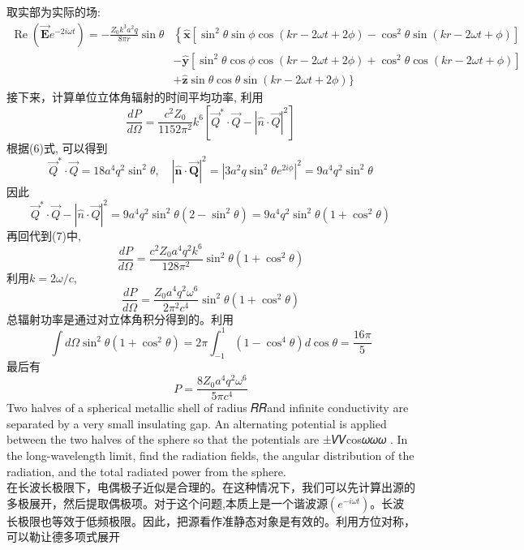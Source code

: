 \documentclass[UTF8,9pt]{ctexart}
\begin{document}
取实部为实际的场:$$ 
\begin{aligned} \operatorname{Re}\left(\overrightarrow{\boldsymbol{E}} e^{-2 i \omega t}\right)=-\frac{Z_{0} k^{3} a^{2} q}{8 \pi r} \sin \theta &\left\{\hat{\boldsymbol{x}}\left[\sin ^{2} \theta \sin \phi \cos (k r-2 \omega t+2 \phi)-\cos ^{2} \theta \sin (k r-2 \omega t+\phi)\right]\right.\\ &-\hat{\boldsymbol{y}}\left[\sin ^{2} \theta \cos \phi \cos (k r-2 \omega t+2 \phi)+\cos ^{2} \theta \cos (k r-2 \omega t+\phi)\right] \\ &+\hat{\boldsymbol{z}} \sin \theta \cos \theta \sin (k r-2 \omega t+2 \phi) \} \end{aligned}
 $$接下来，计算单位立体角辐射的时间平均功率, 利用\begin{equation}
 \frac{d P}{d \Omega}=\frac{c^{2} Z_{0}}{1152 \pi^{2}} k^{6}\left[\vec{Q}^{*} \cdot \vec{Q}-|\hat{n} \cdot \vec{Q}|^{2}\right]
\end{equation}
根据(6)式, 可以得到$$ 
\vec{Q}^{*} \cdot \vec{Q}=18 a^{4} q^{2} \sin ^{2} \theta, \quad|\hat{\boldsymbol{n}} \cdot \overrightarrow{\boldsymbol{Q}}|^{2}=\left|3 a^{2} q \sin ^{2} \theta e^{2 i \phi}\right|^{2}=9 a^{4} q^{2} \sin ^{2} \theta
 $$
 因此
 $$ 
\vec{Q}^{*} \cdot \vec{Q}-|\hat{n} \cdot \vec{Q}|^{2}=9 a^{4} q^{2} \sin ^{2} \theta\left(2-\sin ^{2} \theta\right)=9 a^{4} q^{2} \sin ^{2} \theta\left(1+\cos ^{2} \theta\right)
 $$
再回代到(7)中, $$ 
\frac{d P}{d \Omega}=\frac{c^{2} Z_{0} a^{4} q^{2} k^{6}}{128 \pi^{2}} \sin ^{2} \theta\left(1+\cos ^{2} \theta\right)
 $$
 利用$k=2 \omega / c$,
 $$ 
\frac{d P}{d \Omega}=\frac{Z_{0} a^{4} q^{2} \omega^{6}}{2 \pi^{2} c^{4}} \sin ^{2} \theta\left(1+\cos ^{2} \theta\right)
 $$总辐射功率是通过对立体角积分得到的。利用
 $$ 
\int d \Omega \sin ^{2} \theta\left(1+\cos ^{2} \theta\right)=2 \pi \int_{-1}^{1}\left(1-\cos ^{4} \theta\right) d \cos \theta=\frac{16 \pi}{5}
 $$
 最后有
 $$ 
P=\frac{8 Z_{0} a^{4} q^{2} \omega^{6}}{5 \pi c^{4}}
 $$
 Two halves of a spherical metallic shell of radius 𝑅𝑅and infinite conductivity are separated by a very small insulating gap. An alternating potential is applied between the two halves of the sphere so that the potentials are ±𝑉𝑉cos𝜔𝜔𝜔 . In the long-wavelength limit, find the radiation fields, the angular distribution of the radiation, and the total radiated power from the sphere.\\
在长波长极限下，电偶极子近似是合理的。在这种情况下，我们可以先计算出源的多极展开，然后提取偶极项。对于这个问题,本质上是一个谐波源$\left(e^{-i \omega t}\right)$。长波长极限也等效于低频极限。因此，把源看作准静态对象是有效的。利用方位对称，可以勒让德多项式展开
\end{document}
